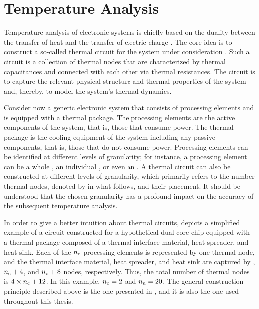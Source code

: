 \section{Temperature Analysis}

Temperature analysis of electronic systems is chiefly based on the duality
between the transfer of heat and the transfer of electric charge
\cite{kreith2000}. The core idea is to construct a so-called thermal 
circuit for the system under consideration \cite{skadron2003}. Such a circuit is
a collection of thermal nodes that are characterized by thermal capacitances and
connected with each other via thermal resistances. The circuit is to capture the
relevant physical structure and thermal properties of the system and, thereby,
to model the system's thermal dynamics.

Consider now a generic electronic system that consists of \nc processing
elements and is equipped with a thermal package. The processing elements are the
active components of the system, that is, those that consume power. The thermal
package is the cooling equipment of the system including any passive components,
that is, those that do not consume power. Processing elements can be identified
at different levels of granularity; for instance, a processing element can be a
whole , an individual , or even an . A thermal 
circuit can also be constructed at different levels of granularity, which
primarily refers to the number thermal nodes, denoted by \nn in what follows,
and their placement. It should be understood that the chosen granularity has a
profound impact on the accuracy of the subsequent temperature analysis.


In order to give a better intuition about thermal  circuits,
 depicts a simplified example of a circuit constructed for a
hypothetical dual-core chip equipped with a thermal package composed of a
thermal interface material, heat spreader, and heat sink. Each of the ${n_\mathrm{c}}$
processing elements is represented by one thermal node, and the thermal
interface material, heat spreader, and heat sink are captured by \nc, ${n_\mathrm{c}} + 4$,
and ${n_\mathrm{c}} + 8$ nodes, respectively. Thus, the total number of thermal nodes \nn
is $4 \times {n_\mathrm{c}} + 12$. In this example, ${n_\mathrm{c}} = 2$ and ${n_\mathrm{n}} = 20$. The general
construction principle described above is the one presented in
\cite{skadron2003, huang2008}, and it is also the one used throughout this
thesis.

